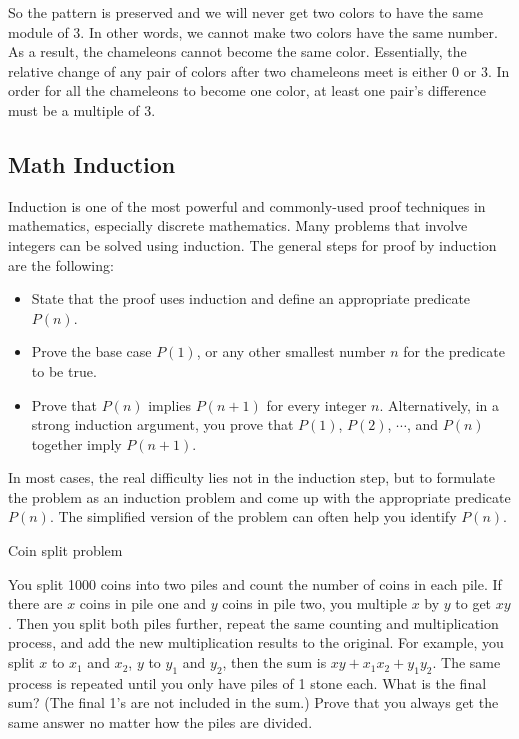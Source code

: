 \begin{solution}
So the pattern is preserved and we will never get two colors to have the same module of
3. In other words, we cannot make two colors have the same number. As a result, the
chameleons cannot become the same color. Essentially, the relative change of any pair of
colors after two chameleons meet is either 0 or 3. In order for all the chameleons to become
one color, at least one pair's difference must be a multiple of 3.
\end{solution}

\subsection{Math Induction}

Induction is one of the most powerful and commonly-used proof techniques in mathematics,
especially discrete mathematics. Many problems that involve integers can be solved using
induction. The general steps for proof by induction are the following:

\begin{itemize}
\item[$\blacksquare$] State that the proof uses induction and define an appropriate predicate $P(n)$.
\item[$\blacksquare$] Prove the base case $P(1)$, or any other smallest number $n$ for the predicate to be true.
\item[$\blacksquare$] Prove that $P(n)$ implies $P(n+1)$ for every integer $n$. Alternatively, in a strong
induction argument, you prove that $P(1)$, $P(2)$, $\cdots$, and $P(n)$ together imply
$P(n+1)$.
\end{itemize}

In most cases, the real difficulty lies not in the induction step, but to formulate the problem
as an induction problem and come up with the appropriate predicate $P(n)$. The simplified
version of the problem can often help you identify $P(n)$.

\begin{problem}{Coin split problem}

You split 1000 coins into two piles and count the number of coins in each pile. If there are
$x$ coins in pile one and $y$ coins in pile two, you multiple $x$ by $y$ to get $xy$. Then you
split both piles further, repeat the same counting and multiplication process, and add the
new multiplication results to the original. For example, you split $x$ to $x_1$ and $x_2$,
$y$ to $y_1$ and $y_2$, then the sum is $xy+x_1x_2+y_1y_2$. The same process is repeated
until you only have piles of 1 stone each. What is the final sum? (The final 1's are not
included in the sum.) Prove that you always get the same answer no matter how the piles are
divided.
\end{problem}
